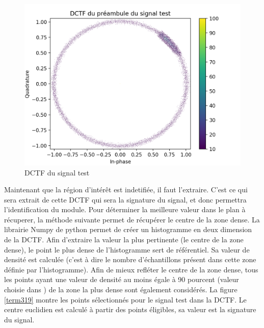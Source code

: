 \begin{figure}[h]
\centering

\includegraphics[scale=0.3]{images/dctf5.png}
\caption{DCTF du signal test}\label{term318}
\end{figure}

Maintenant que la région d'intérêt est indetifiée, il faut l'extraire. C'est ce qui sera extrait de cette DCTF qui sera la signature du signal, et donc permettra l'identification du module. Pour déterminer la meilleure valeur dans le plan à récuperer, la méthode suivante permet de récupérer le centre de la zone dense. La librairie Numpy de python permet de créer un histogramme en deux dimension de la DCTF. Afin d'extraire la valeur la plus pertinente (le centre de la zone dense), le point le plus dense de l'histogramme sert de référentiel. Sa valeur de densité est calculée (c'est à dire le nombre d'échantillons présent dans cette zone définie par l'histogramme). Afin de mieux refléter le centre de la zone dense, tous les points ayant une valeur de densité au moins égale à 90 pourcent (valeur choisie dans \cite{loraDCTF}) de la zone la plus dense sont également considérés. La figure \ref{term319} montre les points sélectionnés pour le signal test dans la DCTF. Le centre euclidien est calculé à partir des points éligibles, sa valeur est la signature du signal.



